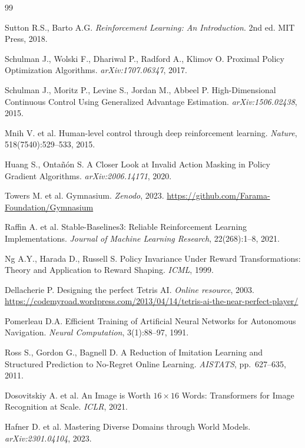 \documentclass[12pt, a4paper]{article}
\begin{document}
\newpage
\begin{thebibliography}{99}

  Sutton R.S., Barto A.G.
  \textit{Reinforcement Learning: An Introduction}.
  2nd ed. MIT Press, 2018.

  Schulman J., Wolski F., Dhariwal P., Radford A., Klimov O.
  Proximal Policy Optimization Algorithms.
  \textit{arXiv:1707.06347}, 2017.

  Schulman J., Moritz P., Levine S., Jordan M., Abbeel P.
  High-Dimensional Continuous Control Using Generalized Advantage Estimation.
  \textit{arXiv:1506.02438}, 2015.

  Mnih V. et al.
  Human-level control through deep reinforcement learning.
  \textit{Nature}, 518(7540):529--533, 2015.

  Huang S., Ontañón S.
  A Closer Look at Invalid Action Masking in Policy Gradient Algorithms.
  \textit{arXiv:2006.14171}, 2020.

  Towers M. et al.
  Gymnasium.
  \textit{Zenodo}, 2023.
  \url{https://github.com/Farama-Foundation/Gymnasium}

  Raffin A. et al.
  Stable-Baselines3: Reliable Reinforcement Learning Implementations.
  \textit{Journal of Machine Learning Research}, 22(268):1--8, 2021.

  Ng A.Y., Harada D., Russell S.
  Policy Invariance Under Reward Transformations: Theory and Application to Reward Shaping.
  \textit{ICML}, 1999.

  Dellacherie P.
  Designing the perfect Tetris AI.
  \textit{Online resource}, 2003.
  \url{https://codemyroad.wordpress.com/2013/04/14/tetris-ai-the-near-perfect-player/}

  Pomerleau D.A.
  Efficient Training of Artificial Neural Networks for Autonomous Navigation.
  \textit{Neural Computation}, 3(1):88--97, 1991.

  Ross S., Gordon G., Bagnell D.
  A Reduction of Imitation Learning and Structured Prediction to No-Regret Online Learning.
  \textit{AISTATS}, pp.~627--635, 2011.

  Dosovitskiy A. et al.
  An Image is Worth $16\times16$ Words: Transformers for Image Recognition at Scale.
  \textit{ICLR}, 2021.

  Hafner D. et al.
  Mastering Diverse Domains through World Models.
  \textit{arXiv:2301.04104}, 2023.

\end{thebibliography}
\end{document}
